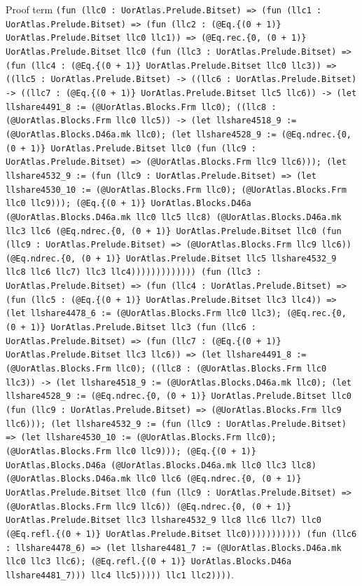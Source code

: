 \documentclass[11pt]{article}
\begin{document}
\noindent Proof term \texttt{(fun (llc0 : UorAtlas.Prelude.Bitset) => (fun (llc1 : UorAtlas.Prelude.Bitset) => (fun (llc2 : (@Eq.\{(0 + 1)\} UorAtlas.Prelude.Bitset llc0 llc1)) => (@Eq.rec.\{0, (0 + 1)\} UorAtlas.Prelude.Bitset llc0 (fun (llc3 : UorAtlas.Prelude.Bitset) => (fun (llc4 : (@Eq.\{(0 + 1)\} UorAtlas.Prelude.Bitset llc0 llc3)) => ((llc5 : UorAtlas.Prelude.Bitset) -> ((llc6 : UorAtlas.Prelude.Bitset) -> ((llc7 : (@Eq.\{(0 + 1)\} UorAtlas.Prelude.Bitset llc5 llc6)) -> (let llshare4491\_8 := (@UorAtlas.Blocks.Frm llc0); ((llc8 : (@UorAtlas.Blocks.Frm llc0 llc5)) -> (let llshare4518\_9 := (@UorAtlas.Blocks.D46a.mk llc0); (let llshare4528\_9 := (@Eq.ndrec.\{0, (0 + 1)\} UorAtlas.Prelude.Bitset llc0 (fun (llc9 : UorAtlas.Prelude.Bitset) => (@UorAtlas.Blocks.Frm llc9 llc6))); (let llshare4532\_9 := (fun (llc9 : UorAtlas.Prelude.Bitset) => (let llshare4530\_10 := (@UorAtlas.Blocks.Frm llc0); (@UorAtlas.Blocks.Frm llc0 llc9))); (@Eq.\{(0 + 1)\} UorAtlas.Blocks.D46a (@UorAtlas.Blocks.D46a.mk llc0 llc5 llc8) (@UorAtlas.Blocks.D46a.mk llc3 llc6 (@Eq.ndrec.\{0, (0 + 1)\} UorAtlas.Prelude.Bitset llc0 (fun (llc9 : UorAtlas.Prelude.Bitset) => (@UorAtlas.Blocks.Frm llc9 llc6)) (@Eq.ndrec.\{0, (0 + 1)\} UorAtlas.Prelude.Bitset llc5 llshare4532\_9 llc8 llc6 llc7) llc3 llc4))))))))))))) (fun (llc3 : UorAtlas.Prelude.Bitset) => (fun (llc4 : UorAtlas.Prelude.Bitset) => (fun (llc5 : (@Eq.\{(0 + 1)\} UorAtlas.Prelude.Bitset llc3 llc4)) => (let llshare4478\_6 := (@UorAtlas.Blocks.Frm llc0 llc3); (@Eq.rec.\{0, (0 + 1)\} UorAtlas.Prelude.Bitset llc3 (fun (llc6 : UorAtlas.Prelude.Bitset) => (fun (llc7 : (@Eq.\{(0 + 1)\} UorAtlas.Prelude.Bitset llc3 llc6)) => (let llshare4491\_8 := (@UorAtlas.Blocks.Frm llc0); ((llc8 : (@UorAtlas.Blocks.Frm llc0 llc3)) -> (let llshare4518\_9 := (@UorAtlas.Blocks.D46a.mk llc0); (let llshare4528\_9 := (@Eq.ndrec.\{0, (0 + 1)\} UorAtlas.Prelude.Bitset llc0 (fun (llc9 : UorAtlas.Prelude.Bitset) => (@UorAtlas.Blocks.Frm llc9 llc6))); (let llshare4532\_9 := (fun (llc9 : UorAtlas.Prelude.Bitset) => (let llshare4530\_10 := (@UorAtlas.Blocks.Frm llc0); (@UorAtlas.Blocks.Frm llc0 llc9))); (@Eq.\{(0 + 1)\} UorAtlas.Blocks.D46a (@UorAtlas.Blocks.D46a.mk llc0 llc3 llc8) (@UorAtlas.Blocks.D46a.mk llc0 llc6 (@Eq.ndrec.\{0, (0 + 1)\} UorAtlas.Prelude.Bitset llc0 (fun (llc9 : UorAtlas.Prelude.Bitset) => (@UorAtlas.Blocks.Frm llc9 llc6)) (@Eq.ndrec.\{0, (0 + 1)\} UorAtlas.Prelude.Bitset llc3 llshare4532\_9 llc8 llc6 llc7) llc0 (@Eq.refl.\{(0 + 1)\} UorAtlas.Prelude.Bitset llc0))))))))))) (fun (llc6 : llshare4478\_6) => (let llshare4481\_7 := (@UorAtlas.Blocks.D46a.mk llc0 llc3 llc6); (@Eq.refl.\{(0 + 1)\} UorAtlas.Blocks.D46a llshare4481\_7))) llc4 llc5))))) llc1 llc2))))}.\par
\end{document}

